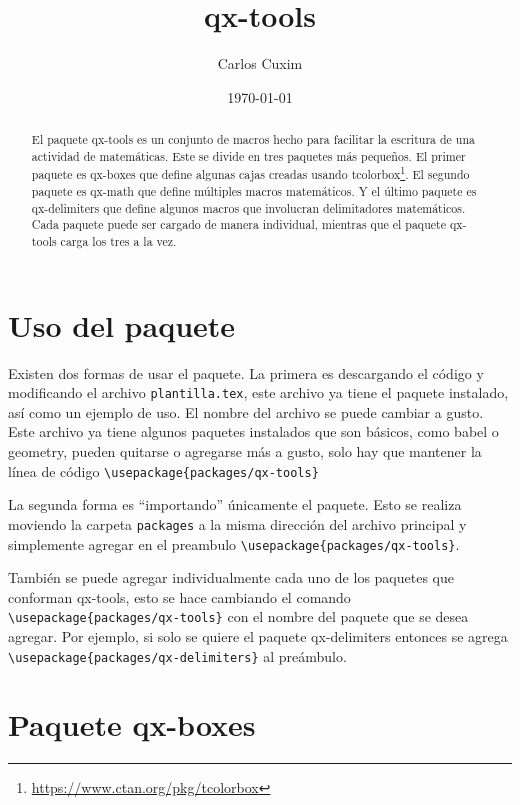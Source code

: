 \documentclass[11pt]{article}
\title{\textsf{qx-tools}}
\author{Carlos Cuxim}
\date{\today}
\begin{document}
\maketitle

\begin{abstract}
  El paquete \textsf{qx-tools} es un conjunto de macros hecho para facilitar la escritura de una actividad de matemáticas. Este se divide en tres paquetes más pequeños. El primer paquete es \textsf{qx-boxes} que define algunas cajas creadas usando \textsf{tcolorbox}\footnote{\url{https://www.ctan.org/pkg/tcolorbox}}. El segundo paquete es \textsf{qx-math} que define múltiples macros matemáticos. Y el último paquete es \textsf{qx-delimiters} que define algunos macros que involucran delimitadores matemáticos. Cada paquete puede ser cargado de manera individual, mientras que el paquete \textsf{qx-tools} carga los tres a la vez.
\end{abstract}




\section{Uso del paquete}

Existen dos formas de usar el paquete. La primera es descargando el código y modificando el archivo \texttt{plantilla.tex}, este archivo ya tiene el paquete instalado, así como un ejemplo de uso. El nombre del archivo se puede cambiar a gusto. Este archivo ya tiene algunos paquetes instalados que son básicos, como \textsf{babel} o \textsf{geometry}, pueden quitarse o agregarse más a gusto, solo hay que mantener la línea de código \verb|\usepackage{packages/qx-tools}|

La segunda forma es ``importando'' únicamente el paquete. Esto se realiza moviendo la carpeta \texttt{packages} a la misma dirección del archivo principal y simplemente agregar en el preambulo \verb|\usepackage{packages/qx-tools}|.

También se puede agregar individualmente cada uno de los paquetes que conforman \textsf{qx-tools}, esto se hace cambiando el comando \verb|\usepackage{packages/qx-tools}| con el nombre del paquete que se desea agregar. Por ejemplo, si solo se quiere el paquete \textsf{qx-delimiters} entonces se agrega \verb|\usepackage{packages/qx-delimiters}| al preámbulo.


\section{Paquete \textsf{qx-boxes}}
\end{document}
